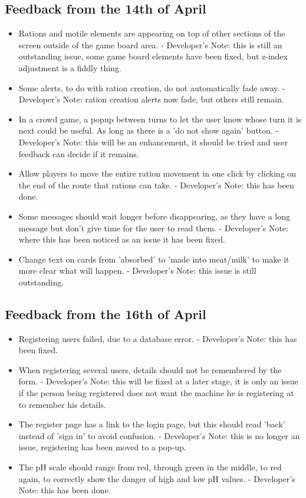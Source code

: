 \subsection{Feedback from the 14th of April}
\begin{itemize}
	\item Rations and motile elements are appearing on top of other sections of the screen outside of the game board area. - Developer's Note: this is still an outstanding issue, some game board elements have been fixed, but z-index adjustment is a fiddly thing. 
	\item Some alerts, to do with ration creation, do not automatically fade away. - Developer's Note: ration creation alerts now fade, but others still remain.
	\item In a crowd game, a popup between turns to let the user know whose turn it is next could be useful. As long as there is a 'do not show again' button. - Developer's Note: this will be an enhancement, it should be tried and user feedback can decide if it remains.
	\item Allow players to move the entire ration movement in one click by clicking on the end of the route that rations can take. - Developer's Note: this has been done.
	\item Some messages should wait longer before disappearing, as they have a long message but don't give time for the user to read them. - Developer's Note: where this has been noticed as an issue it has been fixed.
	\item Change text on cards from 'absorbed' to 'made into meat/milk' to make it more clear what will happen. - Developer's Note: this issue is still outstanding.
\end{itemize}

\subsection{Feedback from the 16th of April}
\begin{itemize}
	\item Registering users failed, due to a database error. - Developer's Note: this has been fixed.
	\item When registering several users, details should not be remembered by the form. - Developer's Note: this will be fixed at a later stage, it is only an issue if the person being registered does not want the machine he is registering at to remember his details.
	\item The register page has a link to the login page, but this should read 'back' instead of 'sign in' to avoid confusion. - Developer's Note: this is no longer an issue, registering has been moved to a pop-up.
	\item The pH scale should range from red, through green in the middle, to red again, to correctly show the danger of high and low pH values. - Developer's Note: this has been done.
\end{itemize}
